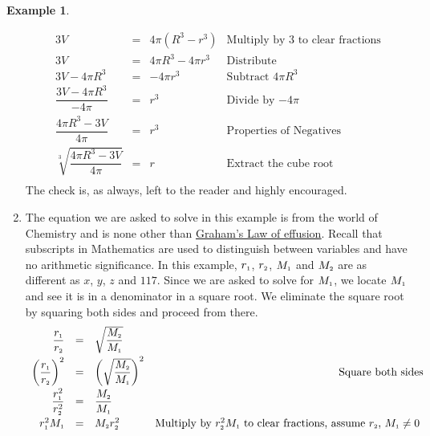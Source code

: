 \documentclass[11pt]{article}
\theoremstyle{definition}  %
\newtheorem{ex}{\bf Example}
\begin{document}
\begin{ex}
\begin{enumerate}
\[\begin{array}{rclr}
3V & = & 4\pi (R^3 - r^3) &  \text{Multiply by $3$ to clear fractions}\\[2pt]

3V & = & 4\pi R^3 - 4\pi r^3 & \text{Distribute} \\[2pt]

3V - 4\pi R^3 & = & -4 \pi r^3 & \text{Subtract $4 \pi R^3$} \\[2pt]

\dfrac{3V - 4\pi R^3}{-4\pi} & = & r^3 & \text{Divide by $-4\pi$} \\[8pt]

\dfrac{4\pi R^3 - 3V}{4\pi} & = & r^3 & \text{Properties of Negatives} \\[10pt]

\sqrt[3]{\dfrac{4\pi R^3 - 3V}{4\pi}} & = & r & \text{Extract the cube root} \\

\end{array} \] The check is, as always, left to the reader and highly encouraged.

\item  The equation we are asked to solve in this example is from the world of Chemistry and is none other than \href{http://en.wikipedia.org/wiki/Graham's_law}{\underline{Graham's Law of effusion}}.  Recall that subscripts in Mathematics are used to distinguish between variables and have no arithmetic significance.  In this example, $r_{\text{\tiny$1$}}$, $r_{\text{\tiny$2$}}$, $M_{\text{\tiny$1$}}$ and $M_{\text{\tiny$2$}}$ are as different as $x$, $y$, $z$ and $117$.  Since we are asked to solve for $M_{\text{\tiny$1$}}$, we locate $M_{\text{\tiny$1$}}$ and see it is in a denominator in a square root.  We eliminate the square root by squaring both sides and proceed from there.  \[ \begin{array}{rclr}

 \dfrac{r_{\text{\tiny$1$}}}{r_{\text{\tiny$2$}}} & = &  \sqrt{\dfrac{M_{\text{\tiny$2$}}}{M_{\text{\tiny$1$}}}} & \\[8pt]

\left(\dfrac{r_{\text{\tiny$1$}}}{r_{\text{\tiny$2$}}}\right)^2 & = & \left(\sqrt{\dfrac{M_{\text{\tiny$2$}}}{M_{\text{\tiny$1$}}}}\right)^2 & \text{Square both sides} \\[8pt]

\dfrac{r_{\text{\tiny$1$}}^2}{r_{\text{\tiny$2$}}^2} & = & \dfrac{M_{\text{\tiny$2$}}}{M_{\text{\tiny$1$}}} & \\[8pt]

r_{\text{\tiny$1$}}^2 M_{\text{\tiny$1$}} & = & M_{\text{\tiny$2$}}r_{\text{\tiny$2$}}^2 & \text{Multiply by $r_{\text{\tiny$2$}}^2 M_{\text{\tiny$1$}}$ to clear fractions, assume $r_{\text{\tiny$2$}}$,  $M_{\text{\tiny$1$}} \neq 0$ } \\[2pt]



\end{array}\]
\end{enumerate}
\end{ex}
\end{document}
